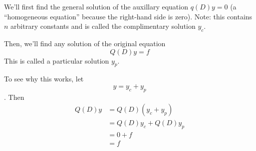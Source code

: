 \documentclass[12pt]{article}
\begin{document}
\begin{example}
We'll first find the general solution of the auxillary equation $q(D)y = 0$ (a ``homogeneous equation'' because the right-hand side is zero). Note: this contains $n$ arbitrary constants and is called the complimentary solution $y_c$.

Then, we'll find any solution of the original equation \[ Q(D)y = f \] This is called a particular solution $y_p$.

To see why this works, let \[ y = y_c + y_p \]. Then
\begin{align*}
Q(D)y &= Q(D)(y_c + y_p)\\
&= Q(D)y_c + Q(D)y_p\\
&= 0 + f\\
&= f
\end{align*}
\end{example}
\end{document}
